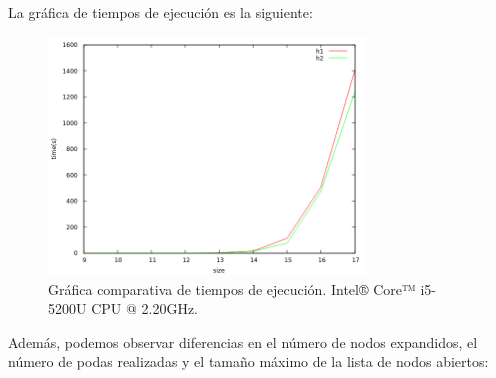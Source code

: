 \documentclass[11pt,a4paper]{article}
\begin{document}
\newpage

			\par
			La gráfica de tiempos de ejecución es la siguiente:

			\vspace{2mm}

			\begin{figure}[h]

				\centering
				\includegraphics[width=0.75\textwidth]{ComparativaH1-H2.png}
				\caption{Gráfica comparativa de tiempos de ejecución. Intel® Core™ i5-5200U CPU @ 2.20GHz.}
				
			\end{figure}

			\vspace{2mm}

			\par
			Además, podemos observar diferencias en el número de nodos expandidos, el número de podas realizadas y el tamaño máximo de la lista de nodos abiertos:

			\vspace{2mm}
\end{document}
